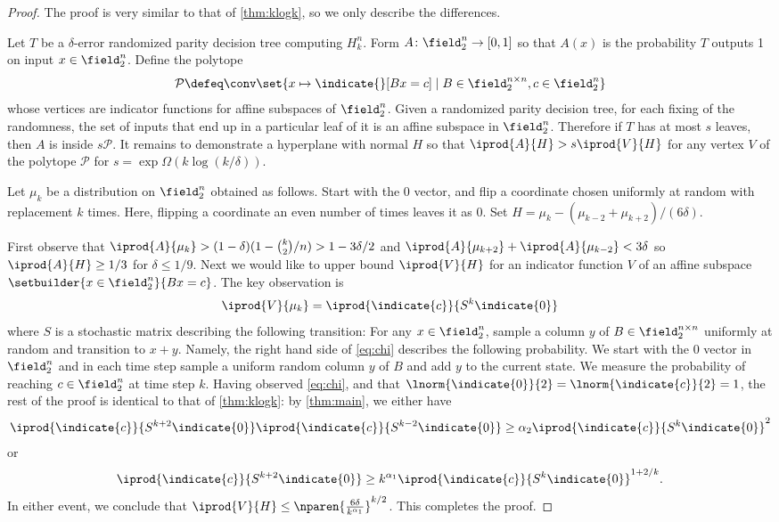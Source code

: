 \begin{proof}
\def\f{\field_2^n}
The proof is very similar to that of \autoref{thm:klogk}, so we only 
describe the differences.

Let $T$ be a $\delta$-error randomized parity decision tree computing
$H^n_k$. Form $A\colon\f\to[0,1]$ so that $A(x)$ is the probability 
$T$ outputs 1 on input $x\in\f$.
Define the polytope
\begin{align*}
\mathcal{P}\defeq\conv
\set{x\mapsto \indicate{}[Bx = c]\mid B\in\field_2^{n\times n}, c\in\f}
\end{align*}
whose vertices are indicator functions for affine subspaces of $\f$.
Given a randomized parity decision tree, 
for each fixing of the randomness,
the set of inputs that end up in
a particular leaf of it is an affine subspace in $\f$. Therefore if
$T$ has at most $s$ leaves, then $A$ is inside $s\mathcal{P}$.
It remains to demonstrate a hyperplane
with normal $H$ so that 
$\iprod{A}{H}>s\iprod{V}{H}$ for any vertex $V$ of the polytope 
$\mathcal{P}$ for $s=\exp \Omega(k\log(k/\delta))$.

Let $\mu_k$ be a distribution on $\f$ obtained as follows. 
Start with the $0$ vector, and flip a coordinate chosen 
uniformly at random with replacement $k$ times. 
Here, flipping a coordinate an even number of times leaves it 
as $0$.
Set $H= \mu_k - (\mu_{k-2}+\mu_{k+2})/(6\delta)$.

First observe that 
$\iprod{A}{\mu_k}>(1-\delta)(1-\binom{k}{2}/n)>1-3\delta/2$
and $\iprod{A}{\mu_{k+2}}+ \iprod{A}{\mu_{k-2}}<3\delta$ so
$\iprod{A}{H}\ge 1/3$ for $\delta\le 1/9$.
Next we would like to upper bound $\iprod{V}{H}$ for an indicator
function $V$ of an affine subspace $\setbuilder{x\in\f}{Bx=c}$.
The key observation is
\begin{align}
\iprod{V}{\mu_k} = \iprod{\indicate{c}}{S^k\indicate{0}}
\label{eq:chi}
\end{align}
where $S$ is a stochastic matrix describing the following transition:
For any $x\in\f$, sample a column $y$ of $B\in\field_2^{n\times n}$ 
uniformly at random and transition to $x+y$. 
Namely, the right hand side of \autoref{eq:chi} describes the following
probability.
We start with the 0 vector in $\f$ and in each time step sample a 
uniform random column $y$ of $B$ and add $y$ to the current state. 
We measure the probability of reaching $c\in\f$ at time step $k$. 
Having observed \autoref{eq:chi}, and that 
$\lnorm{\indicate{0}}{2} = \lnorm{\indicate{c}}{2} = 1$,
the rest of the proof is identical to that of \autoref{thm:klogk}: 
by \autoref{thm:main}, we either have 
\begin{align*}
\iprod{\indicate{c}}{S^{k+2}\indicate{0}}
\iprod{\indicate{c}}{S^{k-2}\indicate{0}}\ge
  \alpha_2 \iprod{\indicate{c}}{S^k\indicate{0}}^2
\end{align*}
or
\begin{align*}
\iprod{\indicate{c}}{S^{k+2}\indicate{0}}
\ge k^{\alpha_1} \iprod{\indicate{c}}{S^k\indicate{0}}^{1+2/k}.
\end{align*}
In either event, we conclude that $\iprod{V}{H}\le 
\nparen{\frac{6\delta}{k^{\alpha_1}}}^{k/2}$.  This completes the proof.
\end{proof}
